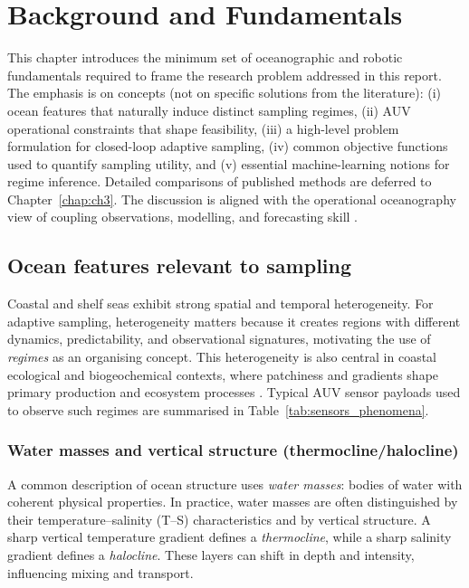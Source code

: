 
\chapter{Background and Fundamentals} \label{chap:ch2}

This chapter introduces the minimum set of oceanographic and robotic fundamentals required to
frame the research problem addressed in this report. The emphasis is on concepts (not on specific
solutions from the literature): (i) ocean features that naturally induce distinct sampling regimes,
(ii) AUV operational constraints that shape feasibility, (iii) a high-level problem formulation for
closed-loop adaptive sampling, (iv) common objective functions used to quantify sampling utility,
and (v) essential machine-learning notions for regime inference. Detailed comparisons of published
methods are deferred to Chapter~\ref{chap:ch3}. The discussion is aligned with the operational
oceanography view of coupling observations, modelling, and forecasting skill \parencite{guo2025orcadl,balaji2022gcmobsolete}.

\section{Ocean features relevant to sampling} \label{sec:ocean_features}

Coastal and shelf seas exhibit strong spatial and temporal heterogeneity. For adaptive sampling,
heterogeneity matters because it creates regions with different dynamics, predictability, and
observational signatures, motivating the use of \emph{regimes} as an organising concept. This
heterogeneity is also central in coastal ecological and biogeochemical contexts, where patchiness
and gradients shape primary production and ecosystem processes \parencite{falkowski1998biogeochemical,martin2003patchiness}.
Typical AUV sensor payloads used to observe such regimes are summarised in Table~\ref{tab:sensors_phenomena}.

\subsection{Water masses and vertical structure (thermocline/halocline)}
A common description of ocean structure uses \emph{water masses}: bodies of water with coherent
physical properties. In practice, water masses are often distinguished by their temperature--salinity
(T--S) characteristics and by vertical structure. A sharp vertical temperature gradient defines a
\emph{thermocline}, while a sharp salinity gradient defines a \emph{halocline}. These layers can
shift in depth and intensity, influencing mixing and transport.


